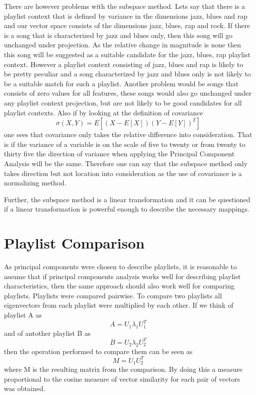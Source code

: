 \documentclass[a4paper,11pt]{kth-mag}
\begin{document}
There are however problems with the subspace method. Lets say that there is a playlist context that is defined by variance in the dimensions jazz, blues and rap and our vector space consists of the dimensions jazz, blues, rap and rock. If there is a song that is characterized by jazz and blues only, then this song will go unchanged under projection. As the relative change in magnitude is none then this song will be suggested as a suitable candidate for the jazz, blues, rap playlist context. However a playlist context consisting of jazz, blues and rap is likely to be pretty peculiar and a song characterized by jazz and blues only is not likely to be a suitable match for such a playlist. Another problem would be songs that consists of zero values for all features, these songs would also go unchanged under any playlist context projection, but are not likely to be good candidates for all playlist contexts. Also if by looking at the definition of covariance 
\begin{equation}
\sigma(X, Y) = E[(X - E[X]) (Y - E[Y])^T]
\end{equation} 
one sees that covariance only takes the relative difference into consideration. That is if the variance of a variable is on the scale of five to twenty or from twenty to thirty five the direction of variance when applying the Principal Component Analysis will be the same. Therefore one can say that the subspace method only takes direction but not location into consideration as the use of covariance is a normalizing method.

Further, the subspace method is a linear transformation and it can be questioned if a linear transformation is powerful enough to describe the necessary mappings.

\section{Playlist Comparison}
As principal components were chosen to describe playlists, it is reasonable to assume that if principal components analysis works well for describing playlist characteristics, then the same approach should also work well for comparing playlists. Playlists were compared pairwise. To compare two playlists all eigenvectors from each playlist were multiplied by each other. If we think of playlist A as  \[A = U_1 \lambda_1 U_1^T\] and of antother playlist B as \[B = U_2 \lambda_2 U_2^T\] then the operation performed to compare them can be seen as \[M = U_1 U_2^T\] where M is the resulting matrix from the comparison. By doing this a measure proportional to the cosine measure of vector similarity for each pair of vectors was obtained. 
\end{document}
